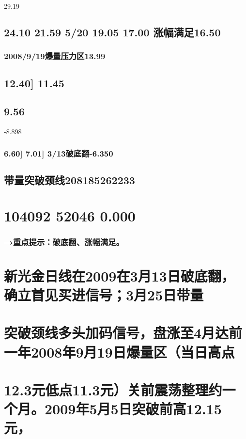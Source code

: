 \documentclass{article}
\begin{document}
29.19

\subsection{24.10 21.59 5/20 19.05 17.00 涨幅满足16.50}

\subsubsection{2008/9/19爆量压力区13.99}

\subsection{12.40] 11.45}

\subsection{9.56}

-8.898

\subsubsection{6.60] 7.01] 3/13破底翻-6.350}

\subsection{带量突破颈线208185262233}

\section{104092 52046 0.000}

\subsubsection{→重点提示：破底翻、涨幅满足。}

\section{新光金日线在2009在3月13日破底翻，确立首见买进信号；3月25日带量}

\section{突破颈线多头加码信号，盘涨至4月达前一年2008年9月19日爆量区（当日高点}

\section{12.3元低点11.3元）关前震荡整理约一个月。2009年5月5日突破前高12.15元，}
\end{document}
